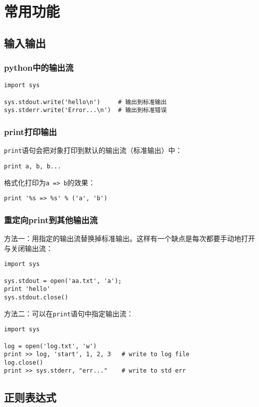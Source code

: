
\chapter{常用功能}

	\section{输入输出}

		\subsection{python中的输出流}

\begin{lstlisting}
import sys

sys.stdout.write('hello\n')     # 输出到标准输出
sys.stderr.write('Error...\n')  # 输出到标准错误
\end{lstlisting}


		\subsection{print打印输出}

			\verb|print|语句会把对象打印到默认的输出流（标准输出）中：

\begin{lstlisting}
print a, b, b...
\end{lstlisting}

			格式化打印为\verb|a => b|的效果：

\begin{lstlisting}
print '%s => %s' % ('a', 'b')
\end{lstlisting}

		\subsection{重定向print到其他输出流}
		
			方法一：用指定的输出流替换掉标准输出。这样有一个缺点是每次都要手动地打开与关闭输出流：
\begin{lstlisting}
import sys

sys.stdout = open('aa.txt', 'a');
print 'hello'
sys.stdout.close()
\end{lstlisting}

			方法二：可以在\verb|print|语句中指定输出流：
\begin{lstlisting}
import sys

log = open('log.txt', 'w')
print >> log, 'start', 1, 2, 3   # write to log file
log.close()
print >> sys.stderr, "err..."    # write to std err
\end{lstlisting}

	\section{正则表达式}
		
		

